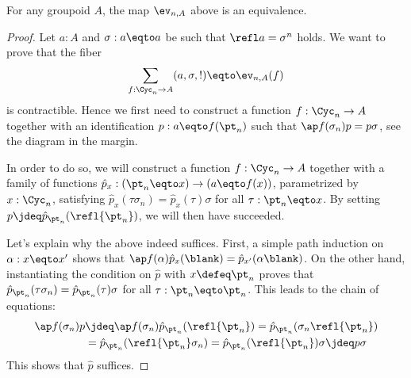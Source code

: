 \begin{theorem}
  For any groupoid $A$, the map $\ev_{n,A}$ above is an equivalence.
  \label{prop:ump-cycn-into-groupoids}
\end{theorem}
\begin{proof}
  Let $a:A$ and $\sigma:a\eqto a$ be such that $\refl a = \sigma^n$ holds.
  We want to prove that the fiber
  \begin{displaymath}
    \sum_{f:\Cyc_n \to A} (a,\sigma, !) \eqto \ev_{n,A}(f)
  \end{displaymath}
  is contractible. Hence we first need to construct a function $f:\Cyc_n \to A$
  together with an identification $p:a\eqto f(\pt_n)$ such that
   $\ap f (\sigma_n) p = p \sigma$, see the diagram in the margin.
  \begin{marginfigure}
\end{marginfigure}
 
  In order to do so, we will construct a function $f:\Cyc_n \to A$ together with 
  a family of functions $\hat p_x: (\pt_n \eqto x) \to (a \eqto f(x))$,
  parametrized by $x:\Cyc_n$,
  satisfying $\hat p_x(\tau\sigma_n) = \hat p_x(\tau) \sigma$ for all
  $\tau: \pt_n \eqto x$. 
  By setting $p \jdeq \hat p_{\pt_n}(\refl {\pt_n})$, we will then have succeeded.
  
  Let's explain why the above indeed suffices.
  First, a simple path induction on $\alpha: x \eqto x'$ shows that 
  $\ap f (\alpha) \hat p_x(\blank) = \hat p_{x'}(\alpha \blank)$.
  On the other hand,
  instantiating the condition on $\hat p$ with $x\defeq \pt_n$ proves that 
  $\hat p_{\pt_n}(\tau \sigma_n) = \hat p_{\pt_n} (\tau) \sigma$ for all
  $\tau: \pt_n \eqto \pt_n$. 
  This leads to the chain of equations:
  \begin{align*}
    \ap f (\sigma_n) p &\jdeq  \ap f (\sigma_n) \hat p_{\pt_n}(\refl {\pt_n})
             = \hat p_{\pt_n}(\sigma_n\refl {\pt_n}) \\
             &= \hat p_{\pt_n}(\refl {\pt_n}\sigma_n) 
              = \hat p_{\pt_n}(\refl {\pt_n}) \sigma \jdeq p \sigma 
  \end{align*}
  This shows that $\hat p$ suffices.


\end{proof}

